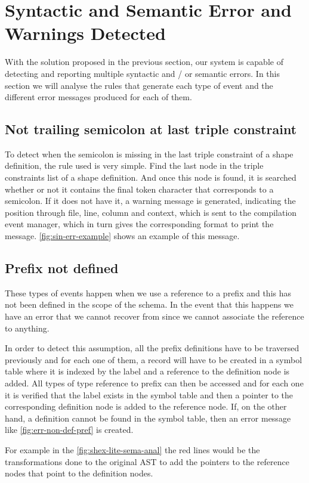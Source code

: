 \section{Syntactic and Semantic Error and Warnings Detected}
With the solution proposed in the previous section, our system is capable of detecting and reporting multiple syntactic
and / or semantic errors. In this section we will analyse the rules that generate each type of event and the different
error messages produced for each of them.

\subsection{Not trailing semicolon at last triple constraint}
To detect when the semicolon is missing in the last triple constraint of a shape definition, the rule used is very simple.
Find the last node in the triple constraints list of a shape definition. And once this node is found, it is searched whether or
not it contains the final token character that corresponds to a semicolon. If it does not have it, a warning message is generated,
indicating the position through file, line, column and context, which is sent to the compilation event manager, which in turn gives
the corresponding format to print the message. \cref{fig:sin-err-example} shows an example of this message.

\subsection{Prefix not defined}
These types of events happen when we use a reference to a prefix and this has not been defined in the scope of the schema.
In the event that this happens we have an error that we cannot recover from since we cannot associate the reference to anything.

In order to detect this assumption, all the prefix definitions have to be traversed previously and for each one of them,
a record will have to be created in a symbol table where it is indexed by the label and a reference to the definition node
is added. All types of type reference to prefix can then be accessed and for each one it is verified that the label exists
in the symbol table and then a pointer to the corresponding definition node is added to the reference node. If, on the other hand,
a definition cannot be found in the symbol table, then an error message like \cref{fig:err-non-def-pref} is created.

For example in the \cref{fig:shex-lite-sema-anal} the red lines would be the transformations done to the original AST to
add the pointers to the reference nodes that point to the definition nodes.


